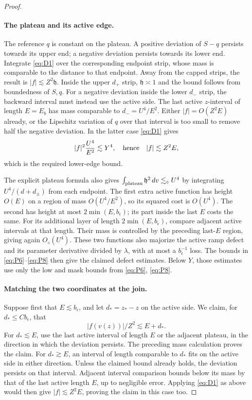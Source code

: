 \begin{proof}
\paragraph{The plateau and its active edge.}
The reference $q$ is constant on the plateau.  A positive
deviation of $S-q$ persists towards its upper end; a negative deviation
persists towards its lower end.  Integrate \eqref{eq:D1} over the
corresponding endpoint strip, whose mass is comparable to the distance
to that endpoint.  Away from the capped strips, the result is
$|f|\lesssim Z^2\mathfrak h$.  Inside the upper $d_+$ strip,
$\mathfrak h\asymp1$ and the bound follows from boundedness of $S,q$.
For a negative deviation inside the lower $d_-$ strip, the backward
interval must instead use
the active side.  The last active $z$-interval of length $E=E_b$ has
mass comparable to $d_-=U^4/E^2$.  Either $|f|=O(Z^2E)$ already, or
the Lipschitz variation of $q$ over that interval is too small to
remove half the negative deviation.  In the latter case \eqref{eq:D1}
gives
\[
 |f|^2\frac{U^4}{E^2}\lesssim Y^4,
 \quad\hbox{hence}\quad |f|\lesssim Z^2E,
\]
which is the required lower-edge bound.

The explicit plateau formula also gives
$\int_{\rm plateau}\mathfrak h^2\,dv\lesssim_\circ U^4$ by
integrating $U^4/(d+d_\pm)$ from each endpoint.  The first extra active
function has height $O(E)$ on a region of mass $O(U^4/E^2)$, so its
squared cost is $O(U^4)$.  The second has height at most
$2\min(E,b_\epsilon)$; its part inside the last $E$ costs the same.
For its additional layer of length $2\min(E,b_\epsilon)$, compare
adjacent active intervals at that length.  Their mass is controlled by
the preceding last-$E$ region, giving again $O_\diamond(U^4)$.
These two functions also majorize the active ramp defect and its
parameter derivative divided by $\lambda$, with at most a
$b_\epsilon^{-1}$ loss.  The bounds in \eqref{eq:P6}--\eqref{eq:P8}
then give the claimed defect estimates.  Below $Y$, those estimates
use only the low and mask bounds from \eqref{eq:P6}, \eqref{eq:P8}.

\paragraph{Matching the two coordinates at the join.}
Suppose first that $E\lesssim b_\epsilon$, and let $d_*=z_*-z$ on
the active side.  We claim, for $d_*\le Cb_\epsilon$, that
\[
 |f(v(z))|/Z^2\lesssim E+d_*.
\]
For $d_*\lesssim E$, use the last active interval of length $E$ or
the adjacent plateau, in the direction in which the deviation
persists.  The preceding mass calculation proves the claim.
For $d_*\gtrsim E$, an interval of length comparable to $d_*$ fits
on the active side in either direction.  Unless the claimed bound
already holds, the deviation persists on that interval.  Adjacent
interval comparison bounds below its mass by that of the last active
length $E$, up to negligible error.  Applying \eqref{eq:D1} as above
would then give $|f|\lesssim Z^2E$, proving the claim in this case too.


\end{proof}
